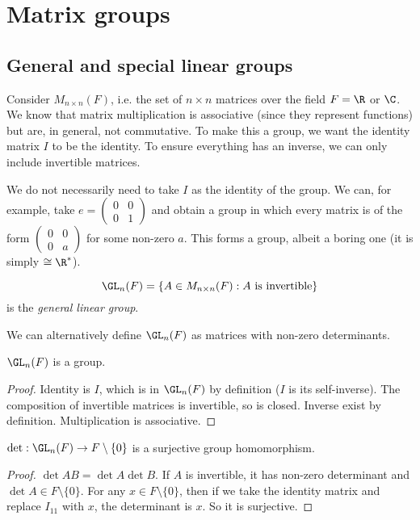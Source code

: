 \documentclass[a4paper]{article}
\begin{document}
  \section{Matrix groups}
  \subsection{General and special linear groups}
  Consider $M_{n\times n}(F)$, i.e. the set of $n\times n$ matrices over the field $F = \R$ or $\C$. We know that matrix multiplication is associative (since they represent functions) but are, in general, not commutative. To make this a group, we want the identity matrix $I$ to be the identity. To ensure everything has an inverse, we can only include invertible matrices.

  \note We do not necessarily need to take $I$ as the identity of the group. We can, for example, take $e = 
  \begin{pmatrix}
    0 & 0\\
    0 & 1
  \end{pmatrix}$ and obtain a group in which every matrix is of the form $\begin{pmatrix}
    0 & 0\\
    0 & a
  \end{pmatrix}$ for some non-zero $a$. This forms a group, albeit a boring one (it is simply $\cong \R^*$).
  \begin{defi}
    \[
      \GL_n(F) = \{A\in M_{n\times n}(F) : A\text{ is invertible}\}
    \]
    is the \emph{general linear group}.
  \end{defi}
  \note We can alternatively define $\GL_n(F)$ as matrices with non-zero determinants.

  \begin{prop}
    $\GL_n(F)$ is a group.
  \end{prop}
  \begin{proof}
    Identity is $I$, which is in $\GL_n(F)$ by definition ($I$ is its self-inverse). The composition of invertible matrices is invertible, so is closed. Inverse exist by definition. Multiplication is associative.
  \end{proof}

  \begin{prop}
    $\det: \GL_n(F) \to F\setminus\{0\}$ is a surjective group homomorphism.
  \end{prop}

  \begin{proof}
    $\det AB = \det A\det B$. If $A$ is invertible, it has non-zero determinant and $\det A\in F\setminus\{0\}$. For any $x\in F\setminus\{0\}$, then if we take the identity matrix and replace $I_{11}$ with $x$, the determinant is $x$. So it is surjective.
  \end{proof}
\end{document}

